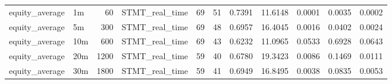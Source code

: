 \begin{tabular}{llrlrrrrrrr}
equity_average & 1m & 60 & STMT_real_time & 69 & 51 & 0.7391 & 11.6148 & 0.0001 & 0.0035 & 0.0002 \\
equity_average & 5m & 300 & STMT_real_time & 69 & 48 & 0.6957 & 16.4045 & 0.0016 & 0.0402 & 0.0024 \\
equity_average & 10m & 600 & STMT_real_time & 69 & 43 & 0.6232 & 11.0965 & 0.0533 & 0.6928 & 0.0643 \\
equity_average & 20m & 1200 & STMT_real_time & 59 & 40 & 0.6780 & 19.3423 & 0.0086 & 0.1469 & 0.0111 \\
equity_average & 30m & 1800 & STMT_real_time & 59 & 41 & 0.6949 & 16.8495 & 0.0038 & 0.0835 & 0.0053 \\
\bottomrule
\end{tabular}
